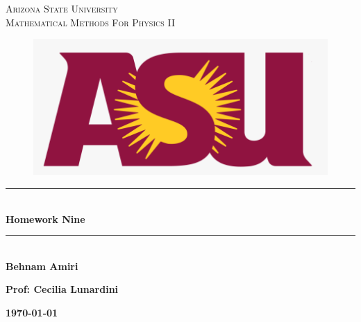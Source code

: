 \documentclass[fleqn]{article}
\begin{document}
  \begin{titlepage}

    \newcommand{\HRule}{\rule{\linewidth}{0.5mm}} %

    \center %



    \textsc{\LARGE Arizona State University}\\[1.5cm] %

    \textsc{\LARGE Mathematical Methods For Physics II }\\[1.5cm] %


    \begin{figure}
      \includegraphics[width=\linewidth]{asu.png}
    \end{figure}


    \HRule \\[0.4cm]
    { \huge \bfseries Homework Nine}\\[0.4cm] 
    \HRule \\[1.5cm]

    \textbf{Behnam Amiri}

    \bigbreak

    \textbf{Prof: Cecilia Lunardini}

    \bigbreak


    \textbf{{\large \today}\\[2cm]}

    \vfill %

  \end{titlepage}
\end{document}
